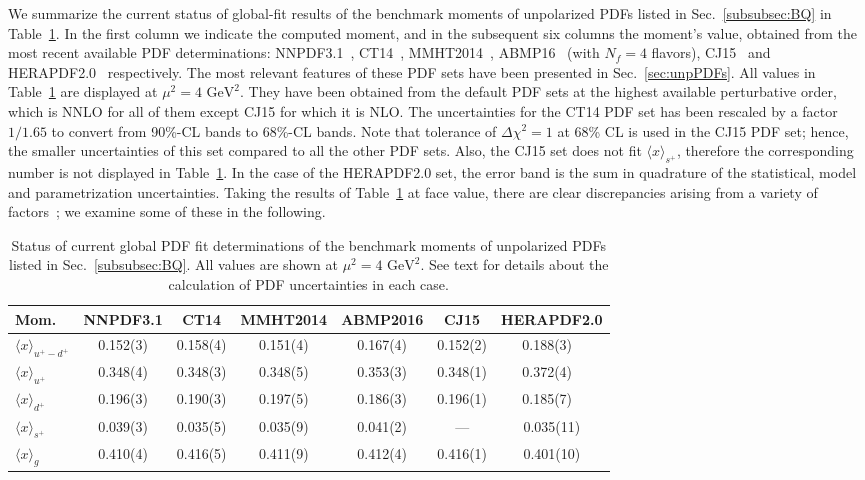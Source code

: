 We summarize the current status of global-fit results of the benchmark
moments of unpolarized PDFs listed in Sec.~\ref{subsubsec:BQ} 
in Table~\ref{tab:unpPDFmoms}.
%
In the first column we indicate the computed moment, and in the subsequent 
six columns the moment's value, obtained from the most recent available PDF 
determinations: NNPDF3.1~\cite{Ball:2017nwa},
CT14~\cite{Dulat:2015mca}, MMHT2014~\cite{Harland-Lang:2014zoa},
ABMP16~\cite{Alekhin:2017kpj} (with $N_f=4$ flavors), 
CJ15~\cite{Accardi:2016qay} and 
HERAPDF2.0~\cite{Abramowicz:2015mha} respectively.
%
The most relevant features of these PDF sets have been presented in 
Sec.~\ref{sec:unpPDFs}.
%
All values in Table~\ref{tab:unpPDFmoms} are displayed
at $\mu^2=4\mbox{ GeV}^2$. 
%
They have been obtained from the default PDF sets at the highest available 
perturbative order, which is NNLO for all of them except CJ15
for which it is NLO.
%
The uncertainties for the CT14 PDF set has been rescaled by a factor $1/1.65$ 
to convert from  90\%-CL bands to  68\%-CL bands.
%
Note that tolerance of $\Delta \chi^2=1$ at 68\% CL is used in the CJ15 PDF 
set; hence, the smaller uncertainties of this set compared to all the other 
PDF sets.
%
Also, the CJ15 set does  not fit $\langle x \rangle_{s^+}$, therefore the 
corresponding number is not displayed in Table~\ref{tab:unpPDFmoms}. 
%
In the case of the HERAPDF2.0 set, the error band is the sum in quadrature 
of the statistical, model and parametrization uncertainties.
%
Taking the results of Table~\ref{tab:unpPDFmoms} at face value,
there are clear discrepancies arising from a variety of 
factors~\cite{Butterworth:2015oua,Accardi:2016ndt};
we examine some of these in the following. 

\begin{table}[!t]
\centering
\renewcommand{\arraystretch}{1.2}
\begin{tabular}{lcccccc}
\toprule
Mom. 
& NNPDF3.1 & CT14 & MMHT2014 & ABMP2016 & CJ15 & HERAPDF2.0 \\
\midrule
$\langle x \rangle_{u^+-d^+}$ 
& 0.152(3) & 0.158(4) & 0.151(4) & 0.167(4) & 0.152(2) & 0.188(3)\ \,\\
$\langle x \rangle_{u^+}$    
& 0.348(4) & 0.348(3) & 0.348(5) & 0.353(3) & 0.348(1) & 0.372(4)\ \,\\
$\langle x \rangle_{d^+}$    
& 0.196(3) & 0.190(3) & 0.197(5) & 0.186(3) & 0.196(1) & 0.185(7)\ \,\\
$\langle x \rangle_{s^+}$    
& 0.039(3) & 0.035(5) & 0.035(9) & 0.041(2) & ---   & 0.035(11)\\
$\langle x \rangle_{g}$     
& 0.410(4) & 0.416(5) & 0.411(9) & 0.412(4) & 0.416(1) & 0.401(10)\\
\bottomrule
\end{tabular}
\caption{\small Status of current global PDF fit determinations of the 
benchmark moments of unpolarized PDFs listed in Sec.~\ref{subsubsec:BQ}.
All values are shown at $\mu^2=4\mbox{ GeV}^2$.
%
See text for details about the calculation of PDF uncertainties in each case.
}
\label{tab:unpPDFmoms}
\end{table}

